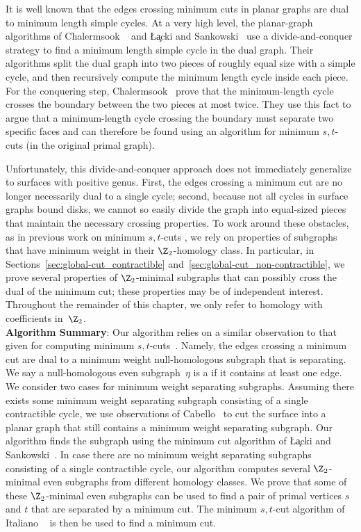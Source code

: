It is well known that the edges crossing minimum cuts in planar graphs are dual to minimum length simple cycles.
At a very high level, the planar-graph algorithms of Chalermsook \etal\ \cite{cfn-dnlta-04} and \L\c{a}cki and Sankowski~\cite{ls-mcsc-11} use a divide-and-conquer strategy to find a minimum length simple cycle in the dual graph. Their algorithms split the dual graph into two pieces of roughly equal size with a simple cycle, and then recursively compute the minimum length cycle inside each piece.  For the conquering step, Chalermsook \etal\ prove that the minimum-length cycle crosses the boundary between the two pieces at most twice.  They use this fact to argue that a minimum-length cycle crossing the boundary must separate two specific faces and can therefore be found using an algorithm for minimum $s,t$-cuts (in the original primal graph).

Unfortunately, this divide-and-conquer approach does not immediately generalize to surfaces with positive genus.  First, the edges crossing a minimum cut are no longer necessarily dual to a single cycle; second, because not all cycles in surface graphs bound disks, we cannot so easily divide the graph into equal-sized pieces that maintain the necessary crossing properties.  To work around these obstacles, as in previous work on minimum $s,t$-cuts \cite{cen-mcshc-09}, we rely on properties of subgraphs that have minimum weight in their $\Z_2$-homology class. In particular, in Sections~\ref{sec:global-cut_contractible} and~\ref{sec:global-cut_non-contractible}, we prove several properties of $\Z_2$-minimal subgraphs that can possibly cross the dual of the minimum cut; these properties may be of independent interest.
Throughout the remainder of this chapter, we only refer to homology with coefficients in~$\Z_2$.\\

\noindent
\textbf{Algorithm Summary}: Our algorithm relies on a similar observation to that given for computing minimum $s,t$-cuts~\cite{cen-mcshc-09}.
Namely, the edges crossing a minimum cut are dual to a minimum weight null-homologous subgraph that is separating.
We say a null-homologous even subgraph~$\eta$ is a  if it contains at least one edge.
We consider two cases for minimum weight separating subgraphs.
Assuming there exists some minimum weight separating subgraph consisting of a single contractible cycle, we use observations of Cabello~\cite[Lemma 4.1]{c-fscss-10} to cut the surface into a planar graph that still contains a minimum weight separating subgraph.
Our algorithm finds the subgraph using the minimum cut algorithm of \L\c{a}cki and Sankowski~\cite{ls-mcsc-11}.
In case there are no minimum weight separating subgraphs consisting of a single contractible cycle,
our algorithm computes several $\Z_2$-minimal even subgraphs from different homology classes.
We prove that some of these $\Z_2$-minimal even subgraphs can be used to find a pair of primal vertices $s$ and $t$ that are separated by a minimum cut.
The minimum $s,t$-cut algorithm of Italiano \etal~\cite{insw-iamcmf-11} is then be used to find a minimum cut.

